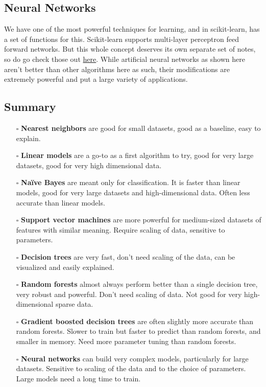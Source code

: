 \documentclass{article}
\newcommand{\code}[1]{{\fontfamily{zi4} \selectfont{#1}}}
\begin{document}
\subsection{Neural Networks}
We have one of the most powerful techniques for learning, and in scikit-learn, \code{sklearn.neural\_network} has a set of functions for this. Scikit-learn supports multi-layer perceptron feed forward networks. But this whole concept deserves its own separate set of notes, so do go check those out \href{https://sbalan7.github.io/assets/notes/deeplearning.pdf}{here}. While artificial neural networks as shown here aren't better than other algorithms here as such, their modifications are extremely powerful and put a large variety of applications.

\subsection{Summary}

\begin{itemize}
\item[$\square$] \textbf{Nearest neighbors} are good for small datasets, good as a baseline, easy to explain.
\item[$\square$] \textbf{Linear models} are a go-to as a first algorithm to try, good for very large datasets, good for very high dimensional data.
\item[$\square$] \textbf{Na{\"i}ve Bayes} are meant only for classification. It is faster than linear models, good for very large datasets and high-dimensional data. Often less accurate than linear models.
\item[$\square$] \textbf{Support vector machines} are more powerful for medium-sized datasets of features with similar meaning. Require scaling of data, sensitive to parameters.
\item[$\square$] \textbf{Decision trees} are very fast, don't need scaling of the data, can be visualized and easily explained.
\item[$\square$] \textbf{Random forests} almost always perform better than a single decision tree, very robust and powerful. Don't need scaling of data. Not good for very high-dimensional sparse data.
\item[$\square$] \textbf{Gradient boosted decision trees} are often slightly more accurate than random forests. Slower to train but faster to predict than random forests, and smaller in memory. Need more parameter tuning than random forests.
\item[$\square$] \textbf{Neural networks} can build very complex models, particularly for large datasets. Sensitive to scaling of the data and to the choice of parameters. Large models need a long time to train.
\end{itemize}
\end{document}
